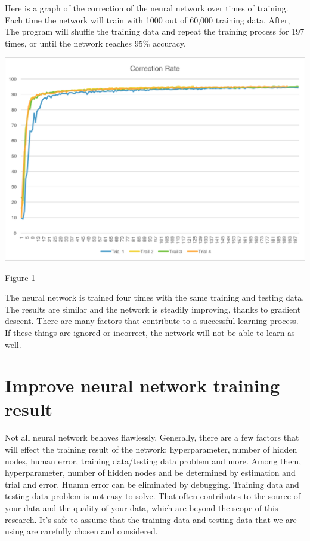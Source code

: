 \documentclass[]{article}
\begin{document}
\begin{multicols}{2}
Here is a graph of the correction of the neural network over times of training. Each time the network will train with 1000 out of 60,000 training data. After, The program will shuffle the training data and repeat the training process for 197 times, or until the network reaches 95\% accuracy. 

\centerline{\includegraphics[width=1\linewidth]{graph2}}
\centerline {Figure 1}
\vspace{0.3cm}

The neural network is trained four times with the same training and testing data. The results are similar and the network is steadily improving, thanks to gradient descent. There are many factors that contribute to a successful learning process. If these things are ignored or incorrect, the network will not be able to learn as well. 

\section{Improve neural network training result}
Not all neural network behaves flawlessly. Generally, there are a few factors that will effect the training result of the network: hyperparameter, number of hidden nodes, human error, training data/testing data problem and more. Among them, hyperparameter, number of hidden nodes and be determined by estimation and trial and error. Huamn error can be eliminated by debugging. Training data and testing data problem is not easy to solve. That often contributes to the source of your data and the quality of your data, which are beyond the scope of this research. It's safe to assume that the training data and testing data that we are using are carefully chosen and considered.  

\end{multicols}
\end{document}
